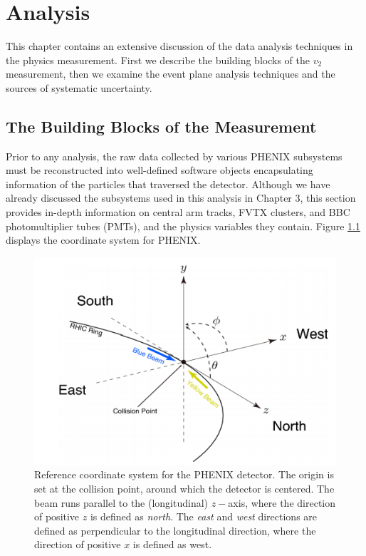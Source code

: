 \chapter{Analysis}
This chapter contains an extensive discussion of the data analysis techniques in the physics measurement. First we describe the building blocks of the  $v_2$ measurement, then we examine the event plane analysis techniques and the sources of systematic uncertainty.
\section{The Building Blocks of the Measurement}
Prior to any analysis, the raw data collected by various PHENIX subsystems must be reconstructed into well-defined software objects encapsulating information of the particles that traversed the detector. Although we have already discussed the subsystems used in this analysis in Chapter 3, this section provides in-depth information on central arm tracks, FVTX clusters, and BBC photomultiplier tubes (PMTs), and the physics variables they contain. Figure \ref{fig:phenix_coord_system} displays the coordinate system for PHENIX.


\begin{figure}[!ht]
\begin{center}
\includegraphics[width=0.55\linewidth]{figs/phenix_coord.png}
\caption{Reference coordinate system for the PHENIX detector. The origin is set at the collision point, around which the detector is centered. The beam runs parallel to the (longitudinal) $z-$axis, where the direction of positive $z$ is defined as \emph{north}. The \emph{east} and \emph{west} directions are defined as perpendicular to the longitudinal direction, where the direction of positive $x$ is defined as west.}
\label{fig:phenix_coord_system}
\end{center}
\end{figure}

